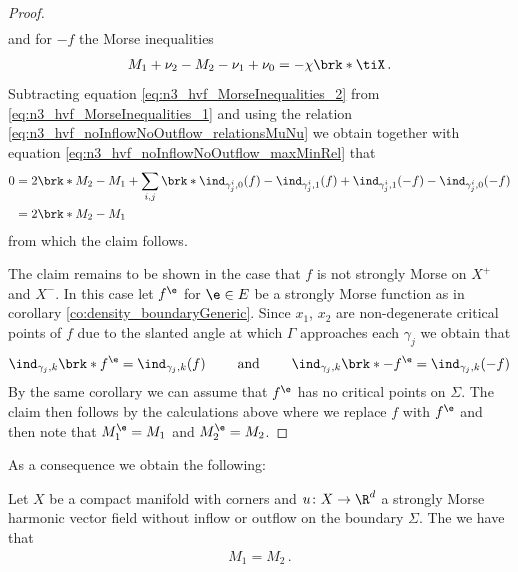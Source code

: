 \begin{proof}
\begin{align}
  \end{align}
  and for $-f$ the Morse inequalities
  \begin{align}
    M_1+\nu_2-M_2-\nu_1+\nu_0=-\chi\brk*{\tiX} \label{eq:n3_hvf_MorseInequalities_2}\,.
  \end{align}
  Subtracting equation \eqref{eq:n3_hvf_MorseInequalities_2} from \eqref{eq:n3_hvf_MorseInequalities_1} and using the relation
  \eqref{eq:n3_hvf_noInflowNoOutflow_relationsMuNu} we obtain
  together with equation \eqref{eq:n3_hvf_noInflowNoOutflow_maxMinRel} that
  \begin{align*}
    0&=2\brk*{M_2-M_1}
    +\sum_{i,j}\brk*{\ind_{\gamma_j^i,0}(f)
    -\ind_{\gamma_j^i,1}(f)
    +\ind_{\gamma_j^i,1}(-f)
    -\ind_{\gamma_j^i,0}(-f)} \\
    &=2\brk*{M_2-M_1}
  \end{align*}
  from which the claim follows.

  The claim remains to be shown in the case that $f$ is not strongly Morse on $X^+$ and $X^-$. In this case let
  $f^\e$ for $\e\in E$ be a strongly Morse function as in corollary \ref{co:density_boundaryGeneric}.
  Since $x_1$, $x_2$ are non-degenerate critical points of $f$
  due to the slanted angle at which
  $\Gamma$ approaches each $\gamma_j$
  we obtain that
  \begin{align}
    \ind_{\gamma_j,k}\brk*{f^\e}=\ind_{\gamma_j,k}(f)\qquad\text{ and }\qquad 
    \ind_{\gamma_j,k}\brk*{-f^\e}=\ind_{\gamma_j,k}(-f)
    \label{eq:n3_hvf_noInflowNoOutflow_morse_indexApprox}
  \end{align}
  By the same corollary we can assume that $f^\e$ has no critical points on
  $\Sigma$.
  The claim then follows by the calculations above where we replace
  $f$ with $f^\e$ and then note that $M_1^\e=M_1$ and $M_2^\e=M_2$.
\end{proof}

As a consequence we obtain the following:
\begin{corollary}
  Let $X$ be a compact manifold with corners and $u\colon X\to\R^d$ a strongly Morse harmonic vector field
  without inflow or outflow on the boundary $\Sigma$. The we have that
  \begin{align*}
    M_1=M_2\,.
  \end{align*}
\end{corollary}




\glsaddall
\printunsrtglossary[type=symbols,style=long]



\nocite{*}
\printbibliography
{}


